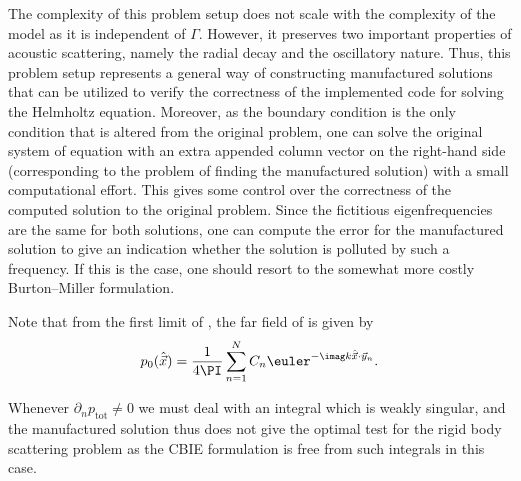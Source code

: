 The complexity of this problem setup does not scale with the complexity of the model as it is independent of $\Gamma$. However, it preserves two important properties of acoustic scattering, namely the radial decay and the oscillatory nature. Thus, this problem setup represents a general way of constructing manufactured solutions that can be utilized to verify the correctness of the implemented code for solving the Helmholtz equation. Moreover, as the boundary condition is the only condition that is altered from the original problem, one can solve the original system of equation with an extra appended column vector on the right-hand side (corresponding to the problem of finding the manufactured solution) with a small computational effort. This gives some control over the correctness of the computed solution to the original problem. Since the fictitious eigenfrequencies are the same for both solutions, one can compute the error for the manufactured solution to give an indication whether the solution is polluted by such a frequency. If this is the case, one should resort to the somewhat more costly Burton--Miller formulation.

Note that from the first limit of , the far field of  is given by
\begin{equation*}
	p_0(\hat{\vec{x}})=\frac{1}{4\PI}\sum_{n=1}^N C_n \euler^{-\imag k \hat{\vec{x}}\cdot\vec{y}_n}.
\end{equation*}

Whenever $\partial_n p_{\mathrm{tot}}\neq 0$ we must deal with an integral which is weakly singular, and the manufactured solution thus does not give the optimal test for the rigid body scattering problem as the CBIE formulation is free from such integrals in this case.

